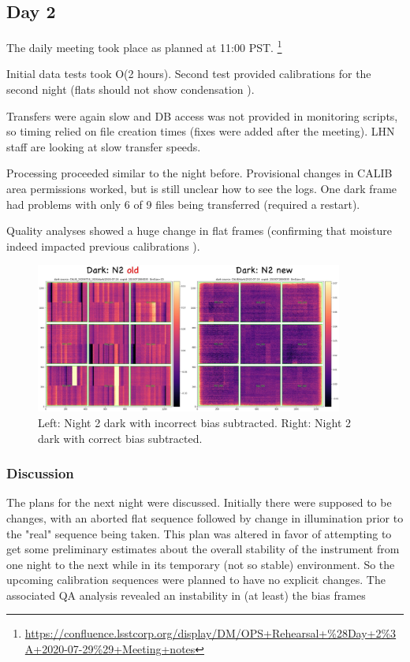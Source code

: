 \subsection{Day 2} \label{sec:day2}

The daily meeting took place as planned at 11:00 PST. \footnote{\url{https://confluence.lsstcorp.org/display/DM/OPS+Rehearsal+\%28Day+2\%3A+2020-07-29\%29+Meeting+notes}}

Initial data tests took O(2 hours).  Second test provided calibrations for the
second night (flats should not show condensation ).

Transfers were again slow and DB access was not provided in monitoring scripts, so
timing relied on file creation times (fixes were added after the meeting).  LHN
staff are looking at slow transfer speeds.

Processing proceeded similar to the night before.  Provisional changes in
CALIB area permissions worked, but is still unclear how to see the logs.  One dark frame
had problems with only 6 of 9 files being transferred (required a restart).

Quality analyses showed a huge change in flat frames (confirming that
moisture indeed impacted previous calibrations ).


\begin{figure}
\begin{center}
\includegraphics[width=0.9\textwidth]{figures/n2bad}
\end{center}
\caption{Left: Night 2 dark with incorrect bias subtracted.  Right: Night 2 dark with correct bias subtracted.\label{fig:d2}}
\end{figure}

\subsubsection{Discussion}

The plans for the next night were discussed.  Initially there were supposed to be
changes, with an aborted flat sequence followed by change in illumination prior to
the "real" sequence being taken.  This plan was altered in favor of attempting to
get some preliminary estimates about the overall stability of the instrument from
one night to the next while in its temporary (not so stable) environment.  So the
upcoming calibration sequences were planned to have no explicit changes.
The associated QA analysis revealed an instability in (at least) the bias frames 


